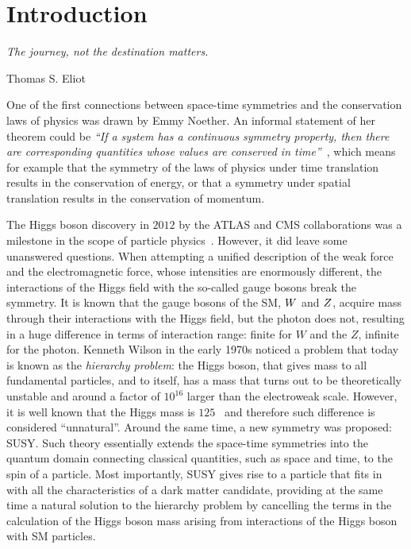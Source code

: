 \chapter*{Introduction}
\epigraph{\emph{The journey, not the destination matters.}}{Thomas S. Eliot}


One of the first connections between space-time symmetries and the conservation laws of physics was drawn by Emmy Noether. An informal statement of her theorem could be \emph{``If a system has a continuous symmetry property, then there are corresponding quantities whose values are conserved in time''}~\cite{thompson1994angular}, which means for example that the symmetry of the laws of physics under time translation results in the conservation of energy, or that a symmetry under spatial translation results in the conservation of momentum.

The Higgs boson discovery in $2012$ by the ATLAS and CMS collaborations was a milestone in the scope of particle physics~\cite{ATLASHiggs2012, CMSHiggs2012}. However, it did leave some unanswered questions. When attempting a unified description of the weak force and the electromagnetic force, whose intensities are enormously different, the interactions of the Higgs field with the so-called gauge bosons break the symmetry. It is known that the gauge bosons of the \ac{SM}, $W$ and $Z$, acquire mass through their interactions with the Higgs field, but the photon does not, resulting in a huge difference in terms of interaction range: finite for $W$ and the $Z$, infinite for the photon. Kenneth Wilson in the early 1970s noticed a problem that today is known as the \emph{hierarchy problem}: the Higgs boson, that gives mass to all fundamental particles, and to itself, has a mass that turns out to be theoretically unstable and around a factor of $10^{16}$ larger than the electroweak scale. However, it is well known that the Higgs mass is $125$ \gev\ and therefore such difference is considered ``unnatural''. Around the same time, a new symmetry was proposed: \ac{SUSY}. Such theory essentially extends the space-time symmetries into the quantum domain connecting classical quantities, such as space and time, to the spin of a particle. Most importantly, \ac{SUSY} gives rise to a particle that fits in with all the characteristics of a dark matter candidate, providing at the same time a natural solution to the hierarchy problem by cancelling the terms in the calculation of the Higgs boson mass arising from interactions of the Higgs boson with \ac{SM} particles.

